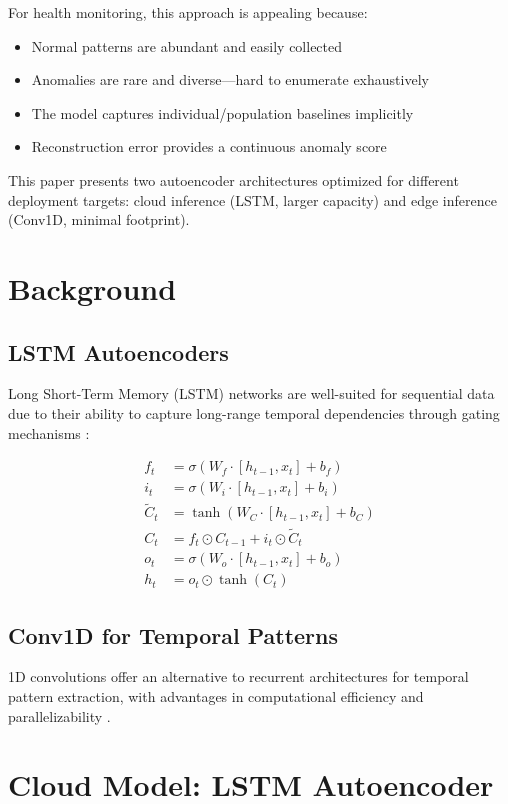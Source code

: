 \documentclass[conference]{IEEEtran}
\begin{document}
For health monitoring, this approach is appealing because:
\begin{itemize}
    \item Normal patterns are abundant and easily collected
    \item Anomalies are rare and diverse---hard to enumerate exhaustively
    \item The model captures individual/population baselines implicitly
    \item Reconstruction error provides a continuous anomaly score
\end{itemize}

This paper presents two autoencoder architectures optimized for different deployment targets: cloud inference (LSTM, larger capacity) and edge inference (Conv1D, minimal footprint).

\section{Background}

\subsection{LSTM Autoencoders}
Long Short-Term Memory (LSTM) networks are well-suited for sequential data due to their ability to capture long-range temporal dependencies through gating mechanisms \cite{lstm}:

\begin{align}
    f_t &= \sigma(W_f \cdot [h_{t-1}, x_t] + b_f) \\
    i_t &= \sigma(W_i \cdot [h_{t-1}, x_t] + b_i) \\
    \tilde{C}_t &= \tanh(W_C \cdot [h_{t-1}, x_t] + b_C) \\
    C_t &= f_t \odot C_{t-1} + i_t \odot \tilde{C}_t \\
    o_t &= \sigma(W_o \cdot [h_{t-1}, x_t] + b_o) \\
    h_t &= o_t \odot \tanh(C_t)
\end{align}

\subsection{Conv1D for Temporal Patterns}
1D convolutions offer an alternative to recurrent architectures for temporal pattern extraction, with advantages in computational efficiency and parallelizability \cite{conv1d}.

\section{Cloud Model: LSTM Autoencoder}
\end{document}
